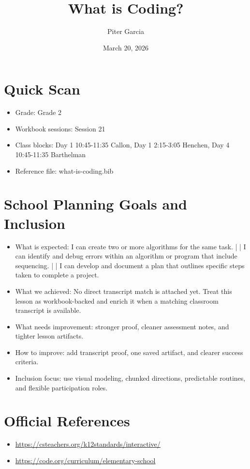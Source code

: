 \documentclass[11pt]{article}
\title{What is Coding?}
\author{Piter Garcia}
\date{March 20, 2026}
\begin{document}
    \maketitle
    \section*{Quick Scan}
    \begin{itemize}[leftmargin=*]
    \item Grade: Grade 2
    \item Workbook sessions: Session 21
    \item Class blocks: Day 1 10:45-11:35 Callon, Day 1 2:15-3:05 Henchen, Day 4 10:45-11:35 Barthelman
    \item Reference file: what-is-coding.bib
    \end{itemize}
    \section*{School Planning Goals and Inclusion}
    \begin{itemize}[leftmargin=*]
    \item What is expected: I can create two or more algorithms for the same task. | | I can identify and debug errors within an algorithm or program that include sequencing. | | I can develop and document a plan that outlines specific steps taken to complete a project.
    \item What we achieved: No direct transcript match is attached yet. Treat this lesson as workbook-backed and enrich it when a matching classroom transcript is available.
    \item What needs improvement: stronger proof, cleaner assessment notes, and tighter lesson artifacts.
    \item How to improve: add transcript proof, one saved artifact, and clearer success criteria.
    \item Inclusion focus: use visual modeling, chunked directions, predictable routines, and flexible participation roles.
    \end{itemize}
    \section*{Official References}
    \begin{itemize}[leftmargin=*]
    \item \url{https://csteachers.org/k12standards/interactive/}
\item \url{https://code.org/curriculum/elementary-school}

    \end{itemize}
    
\end{document}
